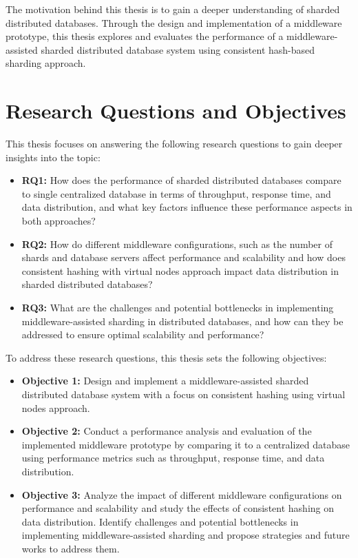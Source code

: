 \noindent The motivation behind this thesis is to gain a deeper understanding of sharded distributed databases. Through the design and implementation of a middleware prototype, this thesis explores and evaluates the performance of a middleware-assisted sharded distributed database system using consistent hash-based sharding approach.

\section{Research Questions and Objectives}
\label{RQ}
This thesis focuses on answering the following research questions to gain deeper insights into the topic:
\begin{itemize}
\item[] \textbf{RQ1:} How does the performance of sharded distributed databases compare to single centralized database in terms of throughput, response time, and data distribution, and what key factors influence these performance aspects in both approaches?

\item[] \textbf{RQ2:} How do different middleware configurations, such as the number of shards and database servers affect performance and scalability and how does consistent hashing with virtual nodes approach impact data distribution in sharded distributed databases?

\item[] \textbf{RQ3:} What are the challenges and potential bottlenecks in implementing middleware-assisted sharding in distributed databases, and how can they be addressed to ensure optimal scalability and performance?
\end{itemize}

\noindent To address these research questions, this thesis sets the following objectives:
\begin{itemize}
\item[] \textbf{Objective 1:} Design and implement a middleware-assisted sharded distributed database system with a focus on consistent hashing using virtual nodes approach.
\item[] \textbf{Objective 2:} Conduct a performance analysis and evaluation of the implemented middleware prototype by comparing it to a centralized database using performance metrics such as throughput, response time, and data distribution.
\item[] \textbf{Objective 3:}  Analyze the impact of different middleware configurations on performance and scalability and study the effects of consistent hashing on data distribution. Identify challenges and potential bottlenecks in implementing middleware-assisted sharding and propose strategies and future works to address them.
\end{itemize}


